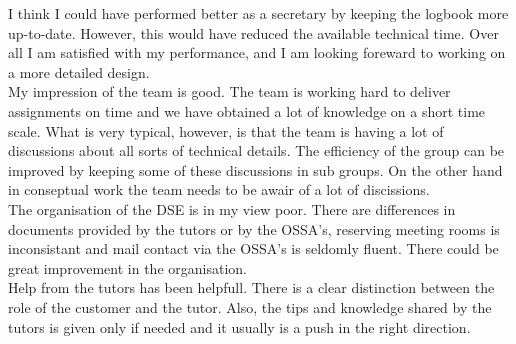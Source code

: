 I think I could have performed better as a secretary by keeping the logbook more up-to-date. However, this would have reduced the available technical time. Over all I am satisfied with my performance, and I am looking foreward to working on a more detailed design.\\

My impression of the team is good. The team is working hard to deliver assignments on time and we have obtained a lot of knowledge on a short time scale. What is very typical, however, is that the team is having a lot of discussions about all sorts of technical details. The efficiency of the group can be improved by keeping some of these discussions in sub groups. On the other hand in conseptual work the team needs to be awair of a lot of discissions.\\

The organisation of the DSE is in my view poor. There are differences in documents provided by the tutors or by the OSSA's, reserving meeting rooms is inconsistant and mail contact via the OSSA's is seldomly fluent. There could be great improvement in the organisation.\\

Help from the tutors has been helpfull. There is a clear distinction between the role of the customer and the tutor. Also, the tips and knowledge shared by the tutors is given only if needed and it usually is a push in the right direction.\\